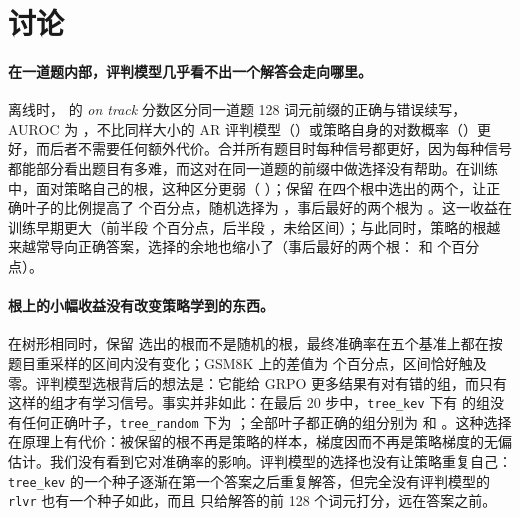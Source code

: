 
\section{讨论}\label{sec:discussion}

\paragraph{在一道题内部，评判模型几乎看不出一个解答会走向哪里。} 离线时，\kev{} 的 \emph{on track} 分数区分同一道题 128 词元前缀的正确与错误续写，AUROC 为 ，不比同样大小的 AR 评判模型（）或策略自身的对数概率（）更好，而后者不需要任何额外代价。合并所有题目时每种信号都更好，因为每种信号都能部分看出题目有多难，而这对在同一道题的前缀中做选择没有帮助。在训练中，面对策略自己的根，这种区分更弱（ ）；保留 \kev{} 在四个根中选出的两个，让正确叶子的比例提高了   个百分点，随机选择为 ，事后最好的两个根为 。这一收益在训练早期更大（前半段  个百分点，后半段 ，未给区间）；与此同时，策略的根越来越常导向正确答案，选择的余地也缩小了（事后最好的两个根： 和  个百分点）。

\paragraph{根上的小幅收益没有改变策略学到的东西。} 在树形相同时，保留 \kev{} 选出的根而不是随机的根，最终准确率在五个基准上都在按题目重采样的区间内没有变化；GSM8K 上的差值为   个百分点，区间恰好触及零。评判模型选根背后的想法是：它能给 GRPO 更多结果有对有错的组，而只有这样的组才有学习信号。事实并非如此：在最后 20 步中，\texttt{tree\_kev} 下有  的组没有任何正确叶子，\texttt{tree\_random} 下为 ；全部叶子都正确的组分别为  和 。这种选择在原理上有代价：被保留的根不再是策略的样本，梯度因而不再是策略梯度的无偏估计。我们没有看到它对准确率的影响。评判模型的选择也没有让策略重复自己：\texttt{tree\_kev} 的一个种子逐渐在第一个答案之后重复解答，但完全没有评判模型的 \texttt{rlvr} 也有一个种子如此，而且 \kev{} 只给解答的前 128 个词元打分，远在答案之前。

